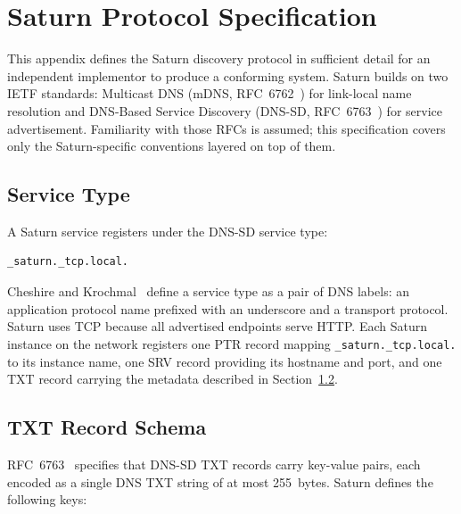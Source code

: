 \chapter{Saturn Protocol Specification}
\label{app:protocol-spec}

This appendix defines the Saturn discovery protocol in sufficient detail for an independent implementor to produce a conforming system. Saturn builds on two IETF standards: Multicast DNS (mDNS, RFC~6762~\cite{rfc6762}) for link-local name resolution and DNS-Based Service Discovery (DNS-SD, RFC~6763~\cite{rfc6763}) for service advertisement. Familiarity with those RFCs is assumed; this specification covers only the Saturn-specific conventions layered on top of them.

\section{Service Type}
\label{app:service-type}

A Saturn service registers under the DNS-SD service type:

\begin{verbatim}
_saturn._tcp.local.
\end{verbatim}

Cheshire and Krochmal~\cite{rfc6763} define a service type as a pair of DNS labels: an application protocol name prefixed with an underscore and a transport protocol. Saturn uses TCP because all advertised endpoints serve HTTP. Each Saturn instance on the network registers one PTR record mapping \texttt{\_saturn.\_tcp.local.} to its instance name, one SRV record providing its hostname and port, and one TXT record carrying the metadata described in Section~\ref{app:txt-schema}.

\section{TXT Record Schema}
\label{app:txt-schema}

RFC~6763~\cite{rfc6763} specifies that DNS-SD TXT records carry key-value pairs, each encoded as a single DNS TXT string of at most 255~bytes. Saturn defines the following keys:

